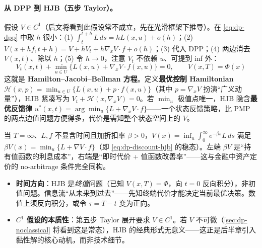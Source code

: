\paragraph{从 DPP 到 HJB（五步 Taylor）。}假设 $V\in C^1$（后文将看到此假设常不成立，先在光滑框架下推导）。在 \cref{eq:dp-dpp} 中取 $h$ 很小：(1) $\int_t^{t+h}L\,ds=hL(x,u)+o(h)$；(2) $V(x+hf,t+h)=V+hV_t+h\nabla_xV\cdot f+o(h)$；(3) 代入 DPP；(4) 两边消去 $V(x,t)$、除以 $h$；(5) 令 $h\to0$，注意 $V_t$ 不依赖 $u$、可提到 inf 外：
\begin{equation}
  \boxed{\;V_t(x,t)+\min_{u\in U}\{L(x,u)+\nabla_xV\cdot f(x,u)\}=0,\qquad V(x,T)=\Phi(x)\;}
  \label{eq:dp-hjb}
\end{equation}
这就是 \textbf{Hamilton--Jacobi--Bellman 方程}。定义\textbf{最优控制 Hamiltonian} $\mathcal H(x,p)=\min_{u\in U}\{L(x,u)+p\cdot f(x,u)\}$（其中 $p=\nabla_xV$ 扮演“广义动量”），HJB 紧凑写为 $V_t+\mathcal H(x,\nabla_xV)=0$。若 $\min_u$ 极值点唯一，HJB 隐含\textbf{最优反馈律} $u^*(x,t)=\arg\min_u\{L+\nabla_xV\cdot f\}$——一个状态反馈策略，比 PMP 的两点边值问题方便得多，代价是需知整个状态空间上的 $V$。

\begin{remark}
当 $T=\infty$、$L,f$ 不显含时间且加折扣率 $\beta>0$，$V(x)=\inf_u\int_0^\infty e^{-\beta s}L\,ds$ 满足 $\beta V(x)=\min_u\{L+\nabla V\cdot f\}$（即 \cref{eq:dp-discount-hjb} 的稳态）。左端 $\beta V$ 是“持有值函数的利息成本”，右端是“即时代价 + 值函数改善率”——这与金融中资产定价的 no-arbitrage 条件完全同构。
\end{remark}

\begin{tcolorbox}[colback=red!4,colframe=red!55!black,title=陷阱专栏：HJB 是终值问题，且依赖 $C^1$]
\begin{itemize}
  \item \textbf{时间方向}：HJB 是\emph{终值}问题（已知 $V(x,T)=\Phi$，向 $t=0$ 反向积分），非初值问题。信息流“从未来到过去”——先知终端代价才能决定当前最优决策。数值上须反向积分，或令 $\tau=T-t$ 变为正向。
  \item \textbf{$C^1$ 假设的本质性}：第五步 Taylor 展开要求 $V\in C^1$。若 $V$ 不可微（\cref{sec:dp-noclassical} 将看到这是常态），HJB 的经典形式无意义——这正是后半章引入黏性解的核心动机，而非技术细节。
\end{itemize}
\end{tcolorbox}

